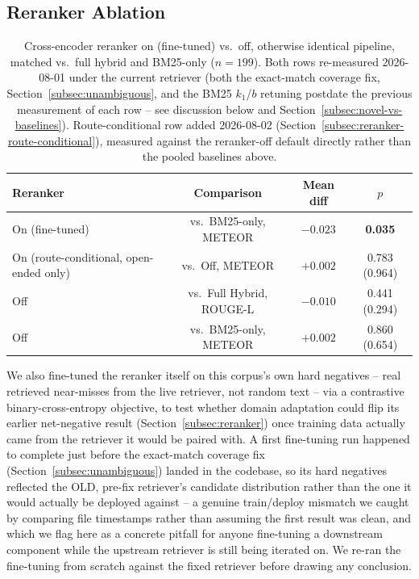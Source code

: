 \documentclass[a4paper,twoside]{article}
\begin{document}
\subsection{Reranker Ablation}
\label{subsec:reranker-ablation}

\begin{table}[t]
\caption{Cross-encoder reranker on (fine-tuned) vs.\ off, otherwise identical pipeline, matched vs.\ full hybrid and BM25-only ($n=199$). Both rows re-measured 2026-08-01 under the current retriever (both the exact-match coverage fix, Section~\ref{subsec:unambiguous}, and the BM25 $k_1$/$b$ retuning postdate the previous measurement of each row -- see discussion below and Section~\ref{subsec:novel-vs-baselines}). Route-conditional row added 2026-08-02 (Section~\ref{subsec:reranker-route-conditional}), measured against the reranker-off default directly rather than the pooled baselines above.}\label{tab:reranker-ablation} \centering
\begin{tabular}{|l|c|c|c|}
\hline
Reranker & Comparison & Mean diff & $p$ \\
\hline
On (fine-tuned) & vs.\ BM25-only, METEOR & $-0.023$ & \textbf{0.035} \\
On (route-conditional, open-ended only) & vs.\ Off, METEOR & $+0.002$ & 0.783 (0.964) \\
Off & vs.\ Full Hybrid, ROUGE-L & $-0.010$ & 0.441 (0.294) \\
Off & vs.\ BM25-only, METEOR & $+0.002$ & 0.860 (0.654) \\
\hline
\end{tabular}
\end{table}

We also fine-tuned the reranker itself on this corpus's own hard negatives -- real retrieved near-misses from the live retriever, not random text -- via a contrastive binary-cross-entropy objective, to test whether domain adaptation could flip its earlier net-negative result (Section~\ref{subsec:reranker}) once training data actually came from the retriever it would be paired with. A first fine-tuning run happened to complete just before the exact-match coverage fix (Section~\ref{subsec:unambiguous}) landed in the codebase, so its hard negatives reflected the OLD, pre-fix retriever's candidate distribution rather than the one it would actually be deployed against -- a genuine train/deploy mismatch we caught by comparing file timestamps rather than assuming the first result was clean, and which we flag here as a concrete pitfall for anyone fine-tuning a downstream component while the upstream retriever is still being iterated on. We re-ran the fine-tuning from scratch against the fixed retriever before drawing any conclusion.
\end{document}
